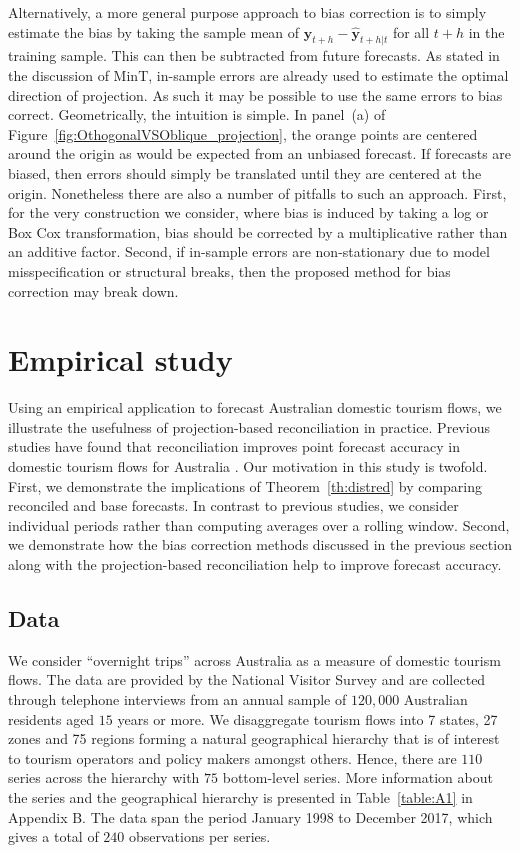 \documentclass[12pt]{article}
\theoremstyle{definition}
\begin{document}
Alternatively, a more general purpose approach to bias correction is to simply estimate the bias by taking the sample mean of $\bm{y}_{t+h}-\hat{\bm{y}}_{t+h|t}$ for all $t+h$ in the training sample. This can then be subtracted from future forecasts. As stated in the discussion of MinT, in-sample errors are already used to estimate the optimal direction of projection. As such it may be possible to use the same errors to bias correct. Geometrically, the intuition is simple. In panel~(a) of Figure~\ref{fig:OthogonalVSOblique_projection}, the orange points are centered around the origin as would be expected from an unbiased forecast. If forecasts are biased, then errors should simply be translated until they are centered at the origin. Nonetheless there are also a number of pitfalls to such an approach. First, for the very construction we consider, where bias is induced by taking a log or Box Cox transformation, bias should be corrected by a multiplicative rather than an additive factor. Second, if in-sample errors are non-stationary due to model misspecification or structural breaks, then the proposed method for bias correction may break down.

\section{Empirical study}\label{sec:EmpStudy}

Using an empirical application to forecast Australian domestic tourism flows, we illustrate the usefulness of projection-based reconciliation in practice. Previous studies have found that reconciliation improves point forecast accuracy in domestic tourism flows for Australia \citep[see for example][]{Athanasopoulos2009, Hyndman2011,WicEtAl2019}. Our motivation in this study is twofold. First, we demonstrate the implications of Theorem~\ref{th:distred} by comparing reconciled and base forecasts. In contrast to previous studies, we consider individual periods rather than computing averages over a rolling window. Second, we demonstrate how the bias correction methods discussed in the previous section along with the projection-based reconciliation help to improve forecast accuracy.

\subsection{Data}

We consider ``overnight trips'' across Australia as a measure of domestic tourism flows. The data are provided by the National Visitor Survey and are collected through telephone interviews from an annual sample of $120,000$ Australian residents aged $15$ years or more. We disaggregate tourism flows into 7 states, 27 zones and 75 regions forming a natural geographical hierarchy that is of interest to tourism operators and policy makers amongst others. Hence, there are $110$ series across the hierarchy with $75$ bottom-level series. More information about the series and the geographical hierarchy is presented in Table~\ref{table:A1} in Appendix B\@. The data span the period January 1998 to December 2017, which gives a total of $240$ observations per series.
\end{document}
